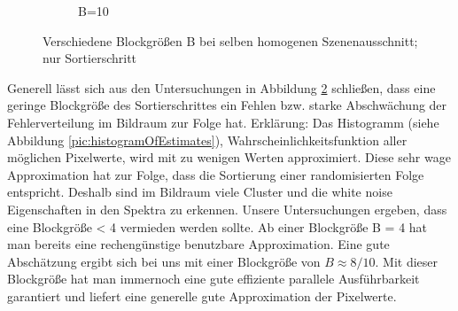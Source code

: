 \begin{figure}[H]
\begin{tcolorbox}[boxrule=4pt,sharp corners=downhill,title=Verschiedene Blockgrößen]
\begin{subfigure}[b]{0.2\linewidth}
         \caption{B=10}
         \label{pic:screen_B10}
    \end{subfigure}
    \end{tcolorbox}
    \caption{Verschiedene Blockgrößen B bei selben homogenen Szenenausschnitt; nur Sortierschritt}
    \label{fig:VerschiedeneBlockgrößenSorting}
\end{figure}

Generell lässt sich aus den Untersuchungen in Abbildung \ref{fig:VerschiedeneBlockgrößenSorting} schließen,
dass eine geringe Blockgröße des Sortierschrittes ein Fehlen bzw. starke Abschwächung der 
 Fehlerverteilung im Bildraum zur Folge hat. Erklärung: Das Histogramm
(siehe Abbildung \ref{pic:histogramOfEstimates}), Wahrscheinlichkeitsfunktion
aller möglichen Pixelwerte, wird mit zu wenigen Werten approximiert. Diese sehr wage Approximation 
hat zur Folge, dass die Sortierung einer randomisierten Folge entspricht. Deshalb sind im Bildraum
viele Cluster und die white noise Eigenschaften in den Spektra zu erkennen.
Unsere Untersuchungen ergeben, dass eine Blockgröße < 4 vermieden werden sollte. Ab einer Blockgröße
B = 4 hat man bereits eine rechengünstige benutzbare Approximation. Eine gute Abschätzung ergibt sich 
bei uns mit einer Blockgröße von $B \approx 8/10$. Mit dieser Blockgröße hat man immernoch eine gute 
effiziente parallele Ausführbarkeit garantiert und liefert eine generelle gute Approximation der 
Pixelwerte.   


